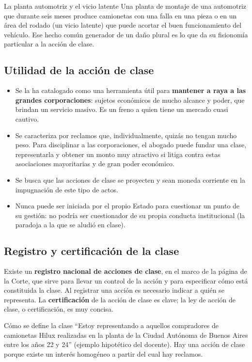 \documentclass[12pt,oneside]{book}
\begin{document}
\begin{example}{La planta automotriz y el vicio latente}
Una planta de montaje de una automotriz que durante seis meses produce camionetas con una falla en una pieza o en un área del rodado (un vicio latente) que puede acortar el buen funcionamiento del vehículo. Ese hecho común generador de un daño plural es lo que da su fisionomía particular a la acción de clase.
\end{example}

\subsection{Utilidad de la acción de clase}

\begin{itemize}
    \item Se la ha catalogado como una herramienta útil para \textbf{mantener a raya a las grandes corporaciones}: sujetos económicos de mucho alcance y poder, que brindan un servicio masivo. Es un freno a quien tiene un mercado cuasi cautivo.
    \item Se caracteriza por reclamos que, individualmente, quizás no tengan mucho peso. Para disciplinar a las corporaciones, el abogado puede fundar una clase, representarla y obtener un monto muy atractivo si litiga contra estas asociaciones mayoritarias y de gran poder económico.
    \item Se busca que las acciones de clase se proyecten y sean moneda corriente en la impugnación de este tipo de actos.
    \item Nunca puede ser iniciada por el propio Estado para cuestionar un punto de su gestión: no podría ser cuestionador de su propia conducta institucional (la paradoja a la que se aludió en clase).
\end{itemize}

\subsection{Registro y certificación de la clase}

Existe un \textbf{registro nacional de acciones de clase}, en el marco de la página de la Corte, que sirve para llevar un control de la acción y para especificar cómo está constituida la clase. Al registrar una acción es necesario indicar a quién se representa. La \textbf{certificación} de la acción de clase es clave; la ley de acción de clase, o certificación, es muy concisa.

\begin{example}{Cómo se define la clase}
``Estoy representando a aquellos compradores de camionetas Hilux realizadas en la planta de la Ciudad Autónoma de Buenos Aires entre los años 22 y 24'' (ejemplo hipotético del docente). Hay una acción de clase porque existe un interés homogéneo a partir del cual hay reclamos.
\end{example}
\end{document}
